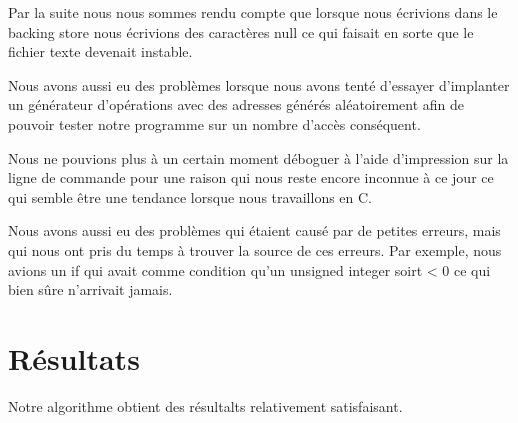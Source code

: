 \documentclass{article}
\begin{document}
Par la suite nous nous sommes rendu compte que lorsque nous écrivions dans le backing store nous écrivions des caractères null ce qui faisait en sorte que le fichier texte devenait instable. 
\par
Nous avons aussi eu des problèmes lorsque nous avons tenté d'essayer d'implanter un générateur d'opérations avec des adresses générés aléatoirement afin de pouvoir tester notre programme sur un nombre d'accès conséquent. 
\par
Nous ne pouvions plus à un certain moment déboguer à l'aide d'impression sur la ligne de commande pour une raison qui nous reste encore inconnue à ce jour ce qui semble être une tendance lorsque nous travaillons en C. 
\par
Nous avons aussi  eu des problèmes qui étaient causé par de petites erreurs, mais qui nous ont pris du temps à trouver la source de ces erreurs. Par exemple, nous avions un if qui avait comme condition qu'un unsigned integer soirt < 0 ce qui bien sûre n'arrivait jamais.
\par

\section{Résultats}
Notre algorithme obtient des résultalts relativement satisfaisant.
\end{document}
